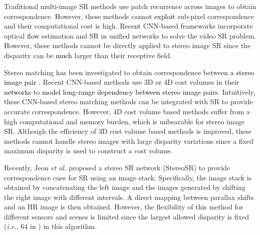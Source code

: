 \documentclass[10pt,twocolumn,letterpaper]{article}
\begin{document}
Traditional multi-image SR methods \cite{2009-GeneralizingtheNonlocalMeanstoSuperResolutionReconstruction-Protter-36-51,2009-SuperResolutionwithoutExplicitSubpixelMotionEstimation-Takeda-1958-1975} use patch recurrence across images to obtain correspondence. However, these methods cannot \textcolor{black}{exploit} sub-pixel correspondence and their computational cost is high. Recent CNN-based frameworks \cite{2017-RealTimeVideoSuperResolutionwithSpatioTemporalNetworksandMotionCompensation-Caballero-2848-2857,2017-DetailRevealingDeepVideoSuperResolution-Tao-4482-4490,2018-LearningforVideoSuperResolutionthroughHROpticalFlowEstimation-LongguangWang--} incorporate optical flow estimation and SR in  unified networks to solve the video SR problem. However, these methods cannot be directly applied to stereo image SR since the disparity can be \textcolor{black}{much} larger than their receptive field.

Stereo matching has been investigated to obtain correspondence between \textcolor{black}{a stereo image pair} \cite{1982-ComputationalStereo-Barnard-553-572,2002-ATaxonomyandEvaluationofDenseTwoFrameStereoCorrespondenceAlgorithms-Scharstein--,2016-EfficientDeepLearningforStereoMatching-Luo-5695-5703}. Recent CNN-based methods \cite{2017-EndtoEndLearningofGeometryandContextforDeepStereoRegression-Kendall-66-75,2018-PyramidStereoMatchingNetwork-Chang--,2018-LearningDeepCorrespondencethroughPriorandPosteriorFeatureConstancy-Liang--,2018-LeftRightComparativeRecurrentModelforStereoMatching-Jie--} use 3D or 4D cost volumes in their \textcolor{black}{networks} to \textcolor{black}{model long-range dependency between stereo image pairs}. Intuitively, these CNN-based stereo matching methods can be	integrated with SR to provide accurate correspondence.  However, 4D cost volume based methods  \cite{2017-EndtoEndLearningofGeometryandContextforDeepStereoRegression-Kendall-66-75,2018-PyramidStereoMatchingNetwork-Chang--} suffer from a high computational and memory burden, which is unbearable for stereo image SR. Although the efficiency of 3D cost volume based methods  \cite{2018-LearningDeepCorrespondencethroughPriorandPosteriorFeatureConstancy-Liang--,2018-LeftRightComparativeRecurrentModelforStereoMatching-Jie--} is improved, these methods cannot handle stereo images with large disparity variations since a fixed maximum disparity is used to construct a cost volume.

Recently, Jeon \emph{et al.} proposed a stereo SR network (StereoSR) \cite{2018-EnhancingtheSpatialResolutionofStereoImagesUsingaParallaxPrior-Jeon--} to provide correspondence cues for SR using an image stack. Specifically, the image stack is obtained by concatenating the left image and the images generated by shifting the right image with different intervals. A direct mapping between parallax shifts and an HR image is then obtained. However, the flexibility of this method for different sensors and scenes is limited since the largest allowed disparity is fixed (\emph{i.e.}, 64 in \cite{2018-EnhancingtheSpatialResolutionofStereoImagesUsingaParallaxPrior-Jeon--}) in this algorithm.
\end{document}
